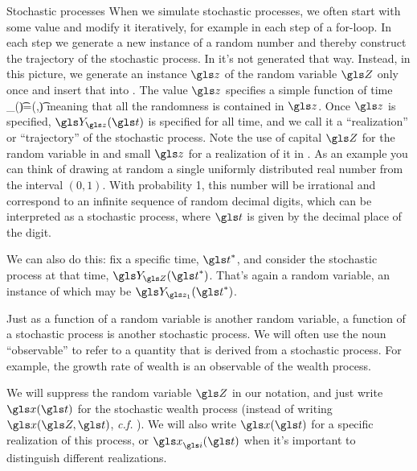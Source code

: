 \begin{excursion}{Stochastic processes}
When we simulate stochastic processes, we often start with some value and modify it iteratively, for example in each step of a for-loop. In each step we generate a new instance of a random number and thereby construct the trajectory of the stochastic process. In  it's not generated that way. Instead, in this picture, we generate an instance $\z$ of the random variable $\Z$ only once and insert that into . The value $\z$ specifies a simple function of time
\be
\Y_{\z}(\t)=\gf(\z,\t)
\ee
meaning that all the randomness is contained in $\z$. Once $\z$ is specified, $\Y_{\z}(\t)$ is specified for all time, and we call it a ``realization'' or ``trajectory'' of the stochastic process. Note the use of capital $\Z$ for the random variable in  and small $\z$ for a realization of it in . As an example you can think of drawing at random a single uniformly distributed real number from the interval $(0,1)$. With probability 1, this number will be irrational and correspond to an infinite sequence of random decimal digits, which can be interpreted as a stochastic process, where $\t$ is given by the decimal place of the digit.

We can also do this: fix a specific time, $\t^*$, and consider the stochastic process at that time, $\Y_{\Z}(\t^*)$. That's again a random variable, an instance of which may be $\Y_{\z_1}(\t^*)$.

Just as a function of a random variable is another random variable, a function of a stochastic process is another stochastic process. We will often use the noun ``observable'' to refer to a quantity that is derived from a stochastic process. For example, the growth rate of wealth is an observable of the wealth process.

We will suppress the random variable $\Z$ in our notation, and just write $\x(\t)$ for the stochastic wealth process (instead of writing $\x(\Z,\t)$, {\it c.f.} ). We will also write $\x(\t)$ for a specific realization of this process, or $\x_\gi(\t)$ when it's important to distinguish different realizations.
\end{excursion}

